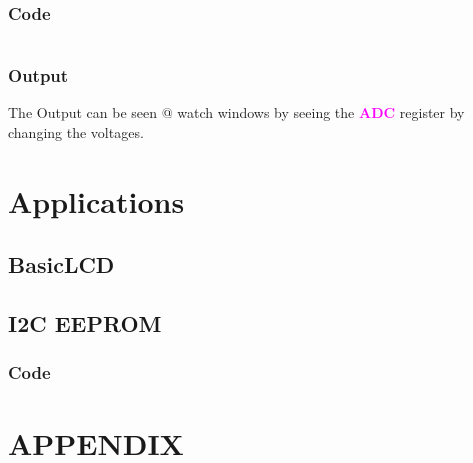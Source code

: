 \documentclass[oneside]{book}
\newcommand{\regFormat}[1]{\textbf{\textcolor{magenta}{#1}}}
\begin{document}
\subsection{Code}
\inputminted[bgcolor=black]{c}{./programFiles/AnalogToDigital.c}

\subsection{Output}
\quad The Output can be seen @ watch windows by seeing the \regFormat{ADC} register by changing the voltages.


\chapter{Applications}
\section{BasicLCD}
\section{I2C EEPROM}
\subsection{Code}







\chapter{APPENDIX}
\end{document}
